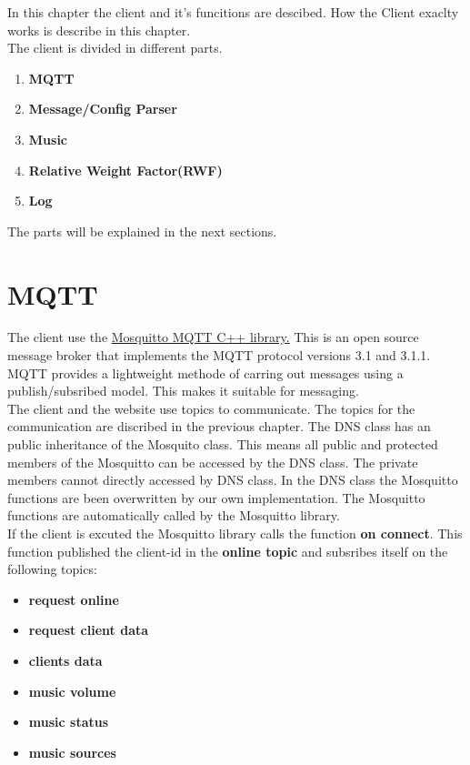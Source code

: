 In this chapter the client and it's funcitions are descibed. How the Client exaclty works is describe in this chapter.\\

The client is divided in different parts.
\small {
\begin{enumerate}
	\item 	\textbf{MQTT}
	\item 	\textbf{Message/Config Parser}
	\item	\textbf{Music}
	\item	\textbf{Relative Weight Factor(RWF)}
	\item 	\textbf{Log}
\end{enumerate}
}

The parts will be explained in the next sections.

\section{MQTT}

The client use the \href{http://mosquitto.org/}{Mosquitto MQTT C++ library.} This is an open source message broker that implements the MQTT protocol versions 3.1 and 3.1.1. MQTT provides a lightweight methode of carring out messages using a publish/subsribed model. This makes it suitable for  messaging.\\

The client and the website use topics to communicate. The topics for the communication are discribed in the previous chapter. The DNS class has an public inheritance of the Mosquito class. This means all public and protected members of the Mosquitto can be accessed by the DNS class. The private members cannot directly accessed by DNS class. In the DNS class the Mosquitto functions are been overwritten by our own implementation. The Mosquitto functions are automatically called by the Mosquitto library.\\

If the client is excuted the Mosquitto library calls the function  
\textbf{ on connect}. This function published the client-id in the \textbf{online topic } and subsribes itself on the following topics:
\small{
\begin{itemize} [noitemsep, nolistsep]
	\item \textbf {request online}
	\item \textbf {request client data}
	\item \textbf {clients data}
	\item \textbf {music volume}
	\item \textbf {music status}
	\item \textbf {music sources\\}
\end{itemize}
}

